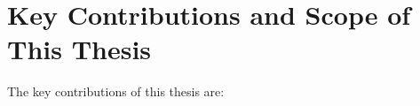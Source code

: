 

\section{Key Contributions and Scope of This Thesis}
\label{Intro:Contributions}

The key contributions of this thesis are:

